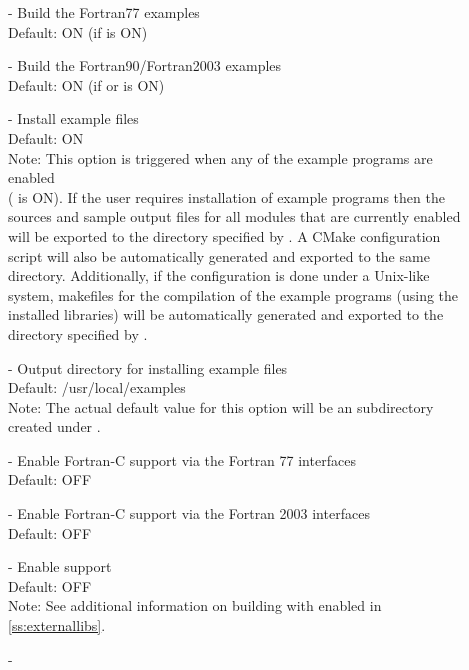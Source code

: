 \begin{description}
\item[] -
  Build the {\sundials} Fortran77 examples
  \\
  Default: ON (if  is ON)
\item[] -
  Build the {\sundials} Fortran90/Fortran2003 examples
  \\
  Default: ON (if  or  is ON)
\item[] -
  Install example files
  \\
  Default: ON
  \\
  Note: This option is triggered when any of the {\sundials}
  example programs are enabled \\
  ( is ON). If the user requires
  installation of example programs then the sources and sample output files
  for all {\sundials} modules that are currently enabled will be exported to
  the directory specified by . A CMake configuration
  script will also be automatically generated and exported to the same directory.
  Additionally, if the configuration is done under a Unix-like system, makefiles
  for the compilation of the example programs (using the installed {\sundials} libraries)
  will be automatically generated and exported to the directory
  specified by .
\item[] -
  Output directory for installing example files
  \\
  Default: /usr/local/examples
  \\
  Note: The actual default value for this option will be an 
  subdirectory created under .
\item[] -
  Enable Fortran-C support via the Fortran 77 interfaces
  \\
  Default: OFF
\item[] -
  Enable Fortran-C support via the Fortran 2003 interfaces
  \\
  Default: OFF
\item[] -
  Enable {\hypre} support
  \\
  Default: OFF
  \\
  Note: See additional information on building with {\hypre} enabled in
  \ref{ss:externallibs}.
\item[] -

\end{description}
